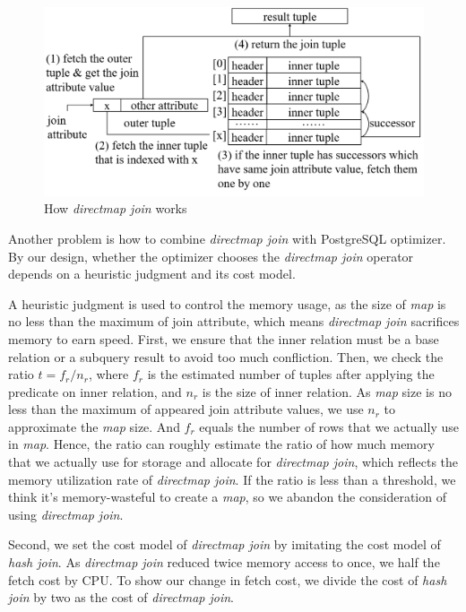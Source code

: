     \begin{figure}[htb]
        \includegraphics[width=\linewidth]{./pic/Figure20.png}
        \caption{How \textit{directmap join} works}
        \label{F20}
        \Description{}
    \end{figure}\par
    Another problem is how to combine \textit{directmap join} with PostgreSQL optimizer. By our design, whether the optimizer chooses the \textit{directmap join} operator depends on a heuristic judgment and its cost model.\par
    A heuristic judgment is used to control the memory usage, as the size of \textit{map} is no less than the maximum of join attribute, which means \textit{directmap join} sacrifices memory to earn speed. First, we ensure that the inner relation must be a base relation or a subquery result to avoid too much confliction. Then, we check the ratio $t=f_r/n_r$, where $f_r$ is the estimated number of tuples after applying the predicate on inner relation, and $n_r$ is the size of inner relation. As \textit{map} size is no less than the maximum of appeared join attribute values, we use $n_r$ to approximate the \textit{map} size. And $f_r$ equals the number of rows that we actually use in \textit{map}. Hence, the ratio can roughly estimate the ratio of how much memory that we actually use for storage and allocate for \textit{directmap join}, which reflects the memory utilization rate of \textit{directmap join}. If the ratio is less than a threshold, we think it's memory-wasteful to create a \textit{map}, so we abandon the consideration of using \textit{directmap join}.\par
    Second, we set the cost model of \textit{directmap join} by imitating the cost model of \textit{hash join}. As \textit{directmap join} reduced twice memory access to once, we half the fetch cost by CPU. To show our change in fetch cost, we divide the cost of \textit{hash join} by two as the cost of \textit{directmap join}.